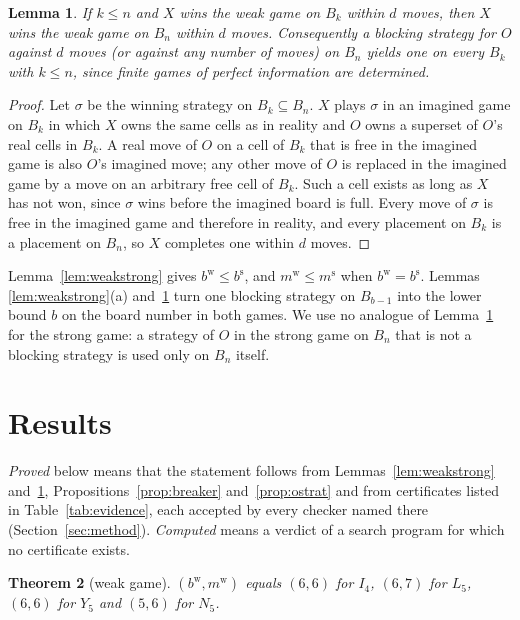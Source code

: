 \documentclass[11pt]{article}
\newtheorem{theorem}{Theorem}
\newtheorem{lemma}[theorem]{Lemma}
\theoremstyle{definition}
\theoremstyle{remark}
\newcommand{\bweak}{b^{\mathrm w}}
\newcommand{\mweak}{m^{\mathrm w}}
\newcommand{\bstr}{b^{\mathrm s}}
\newcommand{\mstr}{m^{\mathrm s}}
\begin{document}
\begin{lemma}\label{lem:monotone}
If $k\le n$ and $X$ wins the weak game on $B_k$ within $d$ moves, then $X$ wins the weak game on
$B_n$ within $d$ moves. Consequently a blocking strategy for $O$ against $d$ moves (or against any
number of moves) on $B_n$ yields one on every $B_k$ with $k\le n$, since finite games of perfect information are
determined.
\end{lemma}

\begin{proof}
Let $\sigma$ be the winning strategy on $B_k\subseteq B_n$. $X$ plays $\sigma$ in an imagined game on
$B_k$ in which $X$ owns the same cells as in reality and $O$ owns a superset of $O$'s real cells in
$B_k$. A real move of $O$ on a cell of $B_k$ that is free in the imagined game is also $O$'s
imagined move; any other move of $O$ is replaced in the imagined game by a move on an arbitrary
free cell of $B_k$. Such a cell exists as long as $X$ has not won, since $\sigma$ wins before the
imagined board is full. Every move of $\sigma$ is free in the imagined game and therefore in
reality, and every placement on $B_k$ is a placement on $B_n$, so $X$ completes one within $d$
moves.
\end{proof}

Lemma~\ref{lem:weakstrong} gives $\bweak\le\bstr$, and $\mweak\le\mstr$ when $\bweak=\bstr$. Lemmas
\ref{lem:weakstrong}(a) and~\ref{lem:monotone} turn one blocking strategy on $B_{b-1}$ into the
lower bound $b$ on the board number in both games. We use no analogue of
Lemma~\ref{lem:monotone} for the strong game: a strategy of $O$ in the strong game on $B_n$ that is
not a blocking strategy is used only on $B_n$ itself.

\section{Results}\label{sec:results}

\emph{Proved} below means that the statement follows from Lemmas~\ref{lem:weakstrong}
and~\ref{lem:monotone}, Propositions~\ref{prop:breaker} and~\ref{prop:ostrat} and from certificates
listed in Table~\ref{tab:evidence}, each accepted by every checker named there
(Section~\ref{sec:method}). \emph{Computed} means a verdict of a search
program for which no certificate exists.

\begin{theorem}[weak game]\label{thm:weak}
$(\bweak,\mweak)$ equals $(6,6)$ for $I_4$, $(6,7)$ for $L_5$, $(6,6)$ for $Y_5$ and $(5,6)$ for $N_5$.
\end{theorem}
\end{document}
